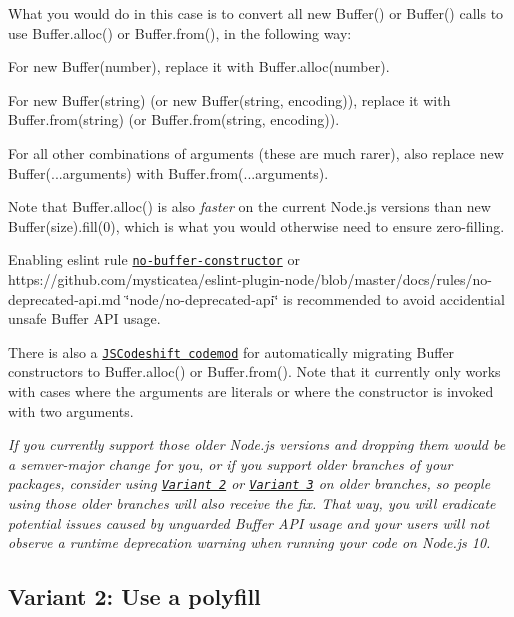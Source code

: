 What you would do in this case is to convert all {\ttfamily new Buffer()} or {\ttfamily Buffer()} calls to use {\ttfamily Buffer.\+alloc()} or {\ttfamily Buffer.\+from()}, in the following way\+:


\begin{DoxyItemize}
\item For {\ttfamily new Buffer(number)}, replace it with {\ttfamily Buffer.\+alloc(number)}.
\item For {\ttfamily new Buffer(string)} (or {\ttfamily new Buffer(string, encoding)}), replace it with {\ttfamily Buffer.\+from(string)} (or {\ttfamily Buffer.\+from(string, encoding)}).
\item For all other combinations of arguments (these are much rarer), also replace {\ttfamily new Buffer(...arguments)} with {\ttfamily Buffer.\+from(...arguments)}.
\end{DoxyItemize}

Note that {\ttfamily Buffer.\+alloc()} is also {\itshape faster} on the current Node.\+js versions than {\ttfamily new Buffer(size).fill(0)}, which is what you would otherwise need to ensure zero-\/filling.

Enabling eslint rule \href{https://eslint.org/docs/rules/no-buffer-constructor}{\tt no-\/buffer-\/constructor} or https\+://github.com/mysticatea/eslint-\/plugin-\/node/blob/master/docs/rules/no-\/deprecated-\/api.\+md \char`\"{}node/no-\/deprecated-\/api\char`\"{} is recommended to avoid accidential unsafe Buffer A\+PI usage.

There is also a \href{https://github.com/joyeecheung/node-dep-codemod#dep005}{\tt J\+S\+Codeshift codemod} for automatically migrating Buffer constructors to {\ttfamily Buffer.\+alloc()} or {\ttfamily Buffer.\+from()}. Note that it currently only works with cases where the arguments are literals or where the constructor is invoked with two arguments.

{\itshape If you currently support those older Node.\+js versions and dropping them would be a semver-\/major change for you, or if you support older branches of your packages, consider using \href{#variant-2}{\tt Variant 2} or \href{#variant-3}{\tt Variant 3} on older branches, so people using those older branches will also receive the fix. That way, you will eradicate potential issues caused by unguarded Buffer A\+PI usage and your users will not observe a runtime deprecation warning when running your code on Node.\+js 10.}

\subsection*{Variant 2\+: Use a polyfill}

